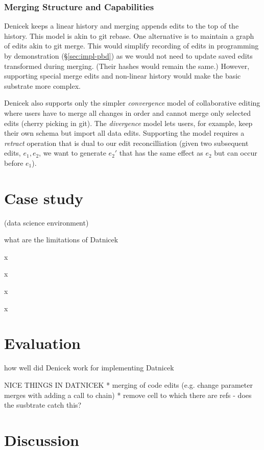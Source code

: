 \documentclass[sigconf,anonymous,screen]{acmart}
\begin{document}
\subsubsection*{Merging Structure and Capabilities}
Denicek keeps a linear history and merging appends edits to the top of the history.
This model is akin to git rebase. One alternative is to maintain a graph of edits akin
to git merge. This would simplify recording of edits in programming by demonstration
(\S\ref{sec:impl-pbd}) as we would not need to update saved edits transformed
during merging. (Their hashes would remain the same.) However, supporting special
merge edits and non-linear history would make the basic substrate more complex.

Denicek also supports only the simpler \emph{convergence} model of collaborative editing \cite{edwards-2025-schema}
where users have to merge all changes in order and cannot merge only selected edits (cherry
picking in git). The \emph{divergence} model lets users, for example, keep their own schema but
import all data edits. Supporting the model requires a \emph{retract} operation \cite{edwards-2021-typed}
that is dual to our edit reconcilliation (given two subsequent edits, $e_1, e_2$, we want
to generate $e_2'$ that has the same effect as $e_2$ but can occur before $e_1$).

\section{Case study}
\label{sec:case}
(data science environment)

what are the limitations of Datnicek

x

x

x

x

\section{Evaluation}
\label{sec:eval}
how well did Denicek work for implementing Datnicek

NICE THINGS IN DATNICEK
* merging of code edits (e.g. change parameter merges with adding a call to chain)
* remove cell to which there are refs - does the susbtrate catch this?


\section{Discussion}
\end{document}
